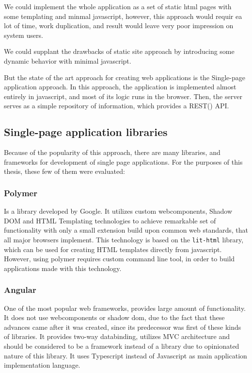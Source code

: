 We could implement the whole application as a set of static html pages with some templating and minmal javascript,
however, this approach would requir ea lot of time, work duplication, and result would leave very poor impression
on system users.

We could supplant the drawbacks of static site approach by introducing some dynamic behavior with minimal javascript.

But the state of the art approach for creating web applications is the Single-page application approach. In this approach,
the application is implemented almost entirely in javascript, and most of its logic runs in the browser. Then, the
server serves as a simple repository of information, which provides a REST() API.

\subsection{Single-page application libraries}
Because of the popularity of this approach, there are many libraries, and frameworks for development of single page applications.
For the purposes of this thesis, these few of them were evaluated:

\subsubsection{Polymer}
Is a library developed by Google. It utilizes custom webcomponents, Shadow DOM  and HTML Templating technologies
to achieve remarkable set of functionality with only a small extension build upon common web standards, that all major
browsers implement. This technology is based on the \verb|lit-html| library, which can be used for creating HTML templates directly from
javascript. However, using polymer requires custom command line tool, in order to build applications made with this technology.

\subsubsection{Angular}
One of the most popular web frameworks, provides large amount of functionality. It does not use webcomponents or shadow dom,
due to the fact that these advances came after it was created, since its predecessor was first of these kinds of libraries.
It provides two-way databinding, utilizes MVC architecture and should be considered to be a framework instead of a library
due to opinionated nature of this library. It uses Typescript instead of Javascript as main application implementation language.

